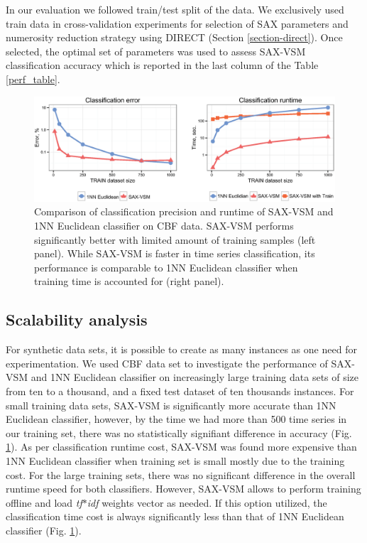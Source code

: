 \documentclass{llncs}
\newcommand{\myfigureshrinkerless}{\vspace{-0.2cm}}
\begin{document}
In our evaluation we followed train/test split of the data. We exclusively used train data in 
cross-validation experiments for selection of SAX parameters and numerosity reduction strategy
using DIRECT (Section \ref{section-direct}). Once selected, the optimal set of parameters 
was used to assess SAX-VSM classification accuracy which is reported in the last column 
of the Table \ref{perf_table}.

\begin{figure}[b]
   \myfigureshrinkerless
   \centering
   \includegraphics[width=115mm]{figures/precision-runtime.eps}
   \caption{Comparison of classification precision and runtime of SAX-VSM and 1NN 
   Euclidean classifier on CBF data. SAX-VSM performs significantly better with limited 
   amount of training samples (left panel). While SAX-VSM is faster in time series 
   classification, its performance is comparable to 1NN Euclidean classifier when 
   training time is accounted for (right panel).}
   \label{fig:precision-runtime}
\end{figure}

\subsection{Scalability analysis}
For synthetic data sets, it is possible to create as many instances as one need for experimentation.
We used CBF data set \cite{cbf} to investigate the performance of SAX-VSM and 1NN Euclidean
classifier on increasingly large training data sets of size from ten to a thousand, and a fixed test
dataset of ten thousands instances. For small training data sets, SAX-VSM is significantly more
accurate than 1NN Euclidean classifier, however, by the time we had more than 500 time series in
our training set, there was no statistically signifiant difference in accuracy (Fig.
\ref{fig:precision-runtime}). 
As per classification runtime cost, SAX-VSM was found more expensive than 1NN Euclidean classifier
when training set is small mostly due to the training cost. For the large training sets, there was
no significant difference in the overall runtime speed for both classifiers.
However, SAX-VSM allows to perform training offline and load \textit{tf$\ast$idf} weights vector as
needed. If this option utilized, the classification time cost is always significantly less than that
of 1NN Euclidean classifier (Fig. \ref{fig:precision-runtime}).
\end{document}
